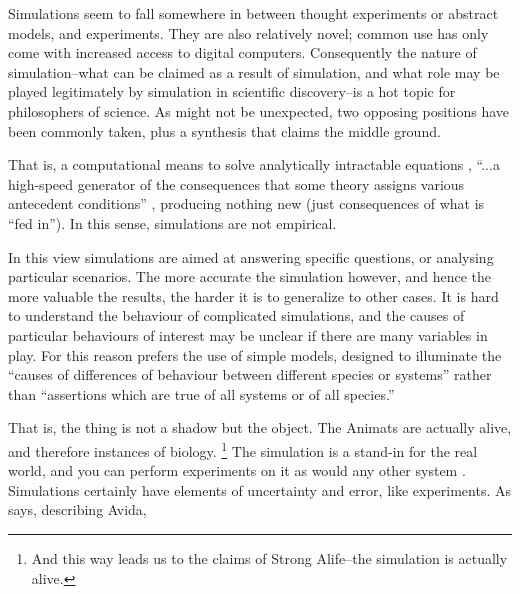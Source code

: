 Simulations seem to fall somewhere in between thought experiments or abstract models, and experiments. They are also relatively novel; common use has only come with increased access to digital computers. Consequently the nature of simulation--what can be claimed as a result of simulation, and what role may be played legitimately by simulation in scientific discovery--is a hot topic for philosophers of science. As might not be unexpected, two opposing positions have been commonly taken, plus a synthesis that claims the middle ground.


That is, a computational means to solve analytically intractable equations \parencite[31]{Winsberg2010}, ``...a high-speed generator of the consequences that some theory assigns various antecedent conditions'' \parencite[quoting from Dennett]{Eldridge}, producing nothing new (just consequences of what is ``fed in''\parencite{DiPaolo2000}). In this sense, simulations are not empirical.

In this view simulations are aimed at answering specific questions, or analysing particular scenarios. The more accurate the simulation however, and hence the more valuable the results, the harder it is to generalize to other cases. It is hard to understand the behaviour of complicated simulations, and the causes of particular behaviours of interest may be unclear if there are many variables in play. For this reason \parencite{MaynardSmith1974} prefers the use of simple models, designed to illuminate the ``causes of differences of behaviour between different species or systems'' rather than ``assertions which are true of all systems or of all species.''


That is, the thing is not a shadow but the object. The Animats are actually alive, and therefore instances of biology.
\footnote{And this way leads us to the claims of Strong Alife--the simulation is actually alive.}
The simulation is a stand-in for the real world, and you can perform experiments on it as would any other system \parencite[31]{Winsberg2010}. Simulations certainly have elements of uncertainty and error, like experiments. As \parencite{Adami2002} says, describing Avida, 

